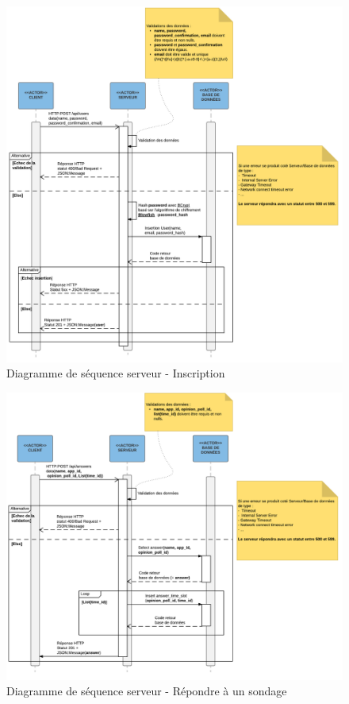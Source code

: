\documentclass[titlepage]{report}
\begin{document}
\begin{figure}[h]
	\caption{Diagramme de séquence serveur - Inscription}
	\label{annexe_diagramme_sequence_serveur_inscription}
	\centering
	\includegraphics[width=\textwidth]{figures/diagrammes/sequence_serveur_inscription.png}
\end{figure}

\begin{figure}[h]
	\caption{Diagramme de séquence serveur - Répondre à un sondage}
	\label{annexe_diagramme_sequence_serveur_repondreSondage}
	\centering
	\includegraphics[width=\textwidth]{figures/diagrammes/sequence_serveur_repondreSondage.png}
\end{figure}
\end{document}
